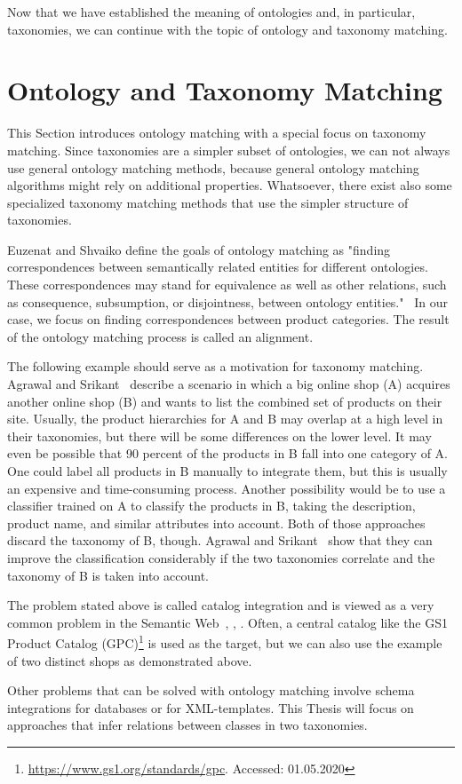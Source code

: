 Now that we have established the meaning of ontologies and, in particular, taxonomies, we can continue with the topic
of ontology and taxonomy matching.

\section{Ontology and Taxonomy Matching}
\label{sec:onto-matching}

This Section introduces ontology matching with a special focus on taxonomy matching.
Since taxonomies are a simpler subset of ontologies, we can not always use general ontology matching methods, because
general ontology matching algorithms might rely on additional properties.
Whatsoever, there exist also some specialized taxonomy matching methods that use the simpler structure of taxonomies.

Euzenat and Shvaiko define the goals of ontology matching as "finding correspondences between
semantically related entities for different ontologies.
These correspondences may stand for equivalence as well as other relations, such as consequence,
subsumption, or disjointness, between ontology entities."~\cite[p. viii]{euzenat2007ontology}
In our case, we focus on finding correspondences between product categories.
The result of the ontology matching process is called an alignment.

The following example should serve as a motivation for taxonomy matching.
Agrawal and Srikant~\cite{agrawal2001integrating} describe a scenario in which a big online shop (A) acquires
another online shop (B) and wants to list the combined set of products on their site.
Usually, the product hierarchies for A and B may overlap at a high level in their taxonomies, but there will
be some differences on the lower level.
It may even be possible that 90 percent of the products in B fall into one category of A\@.
One could label all products in B manually to integrate them, but this is usually an expensive and time-consuming process.
Another possibility would be to use a classifier trained on A to classify the products in B, taking the description, product name,
and similar attributes into account.
Both of those approaches discard the taxonomy of B, though.
Agrawal and Srikant~\cite{agrawal2001integrating} show that they can improve the classification considerably
if the two taxonomies correlate and the taxonomy of B is taken into account.

The problem stated above is called catalog integration and is viewed as a very common problem in the Semantic Web~\cite{agrawal2001integrating},
\cite{meusel2015exploiting}, \cite{zhang2019product}.
Often, a central catalog like the GS1 Product Catalog (GPC)\footnote{\url{https://www.gs1.org/standards/gpc}. Accessed: 01.05.2020} is used as the
target, but we can also use the example of two distinct shops as demonstrated above.

Other problems that can be solved with ontology matching involve schema integrations for databases or for XML-templates.
This Thesis will focus on approaches that infer relations between classes in two taxonomies.
